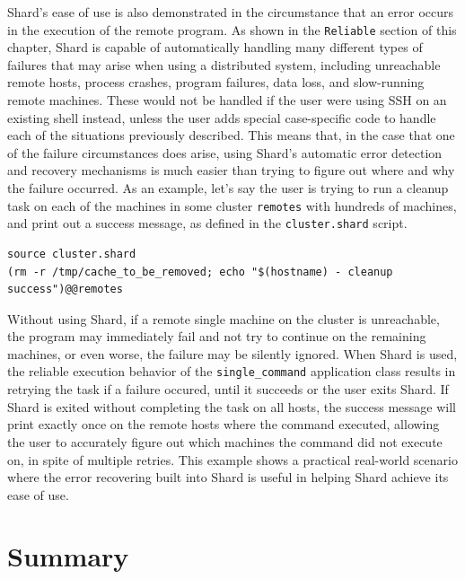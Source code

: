 \documentclass[twoside]{report}
\begin{document}
Shard's ease of use is also demonstrated in the circumstance that an error occurs in the execution of the remote program.
As shown in the \texttt{Reliable} section of this chapter, Shard is capable of automatically handling many different types of failures that may arise when using a distributed system, including unreachable remote hosts, process crashes, program failures, data loss, and slow-running remote machines.
These would not be handled if the user were using SSH on an existing shell instead, unless the user adds special case-specific code to handle each of the situations previously described.
This means that, in the case that one of the failure circumstances does arise, using Shard's automatic error detection and recovery mechanisms is much easier than trying to figure out where and why the failure occurred.
As an example, let's say the user is trying to run a cleanup task on each of the machines in some cluster \texttt{remotes} with hundreds of machines, and print out a success message, as defined in the \texttt{cluster.shard} script.

\begin{minipage}[c]{\textwidth-15pt}
  \begin{lstlisting}[language=Shard]
source cluster.shard
(rm -r /tmp/cache_to_be_removed; echo "$(hostname) - cleanup success")@@remotes
\end{lstlisting}
  \smallskip
\end{minipage}

Without using Shard, if a remote single machine on the cluster is unreachable, the program may immediately fail and not try to continue on the remaining machines, or even worse, the failure may be silently ignored.
When Shard is used, the reliable execution behavior of the \texttt{single\_command} application class results in retrying the task if a failure occured, until it succeeds or the user exits Shard.
If Shard is exited without completing the task on all hosts, the success message will print exactly once on the remote hosts where the command executed, allowing the user to accurately figure out which machines the command did not execute on, in spite of multiple retries.
This example shows a practical real-world scenario where the error recovering built into Shard is useful in helping Shard achieve its ease of use.

\section{Summary}
\end{document}
